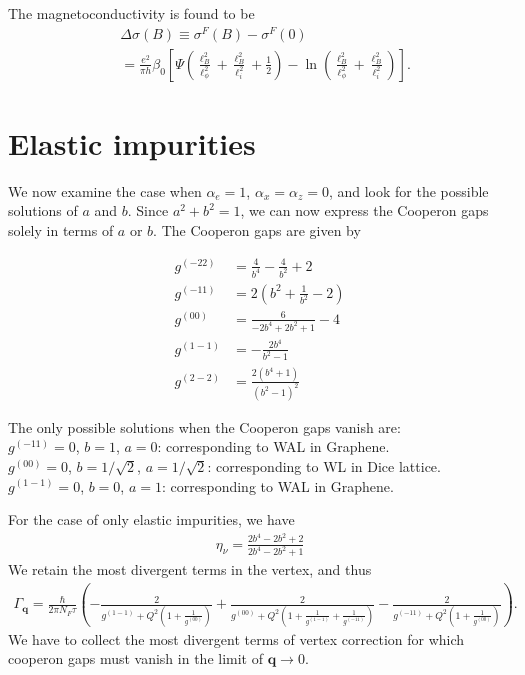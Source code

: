 \documentclass[aps,prb,amsmath,amssymb,footinbib,showpacs,twocolumn]{revtex4-2}
\begin{document}
\begin{widetext}
The magnetoconductivity is found to be
\begin{align}
    &\Delta\sigma(B) \equiv  \sigma^{F}(B)- \sigma^{F}(0) \nonumber\\ 
    &=\frac{e^{2}}{\pi h}\beta_{0}\left[\Psi\left(\frac{\ell^{2}_{B}}{\ell^{2}_{\phi}}+\frac{\ell^{2}_{B}}{\ell^{2}_{i}}+\frac{1}{2}\right)-\ln\left(\frac{\ell^{2}_{B}}{\ell^{2}_{\phi}}+\frac{\ell^{2}_{B}}{\ell^{2}_{i}}\right)\right].
\end{align}
\section{Elastic impurities} 

We now examine the case when $\alpha_e=1$, $\alpha_x=\alpha_z=0$, and look for the possible solutions of $a$ and $b$. Since $a^2+b^2=1$, we can now express the Cooperon gaps solely in terms of $a$ or $b$. The Cooperon gaps are given by 

\begin{align}
    g^{(-22)}&=\frac{4}{b^4}-\frac{4}{b^2}+2\nonumber\\
    g^{(-11)}&=2 \left(b^2+\frac{1}{b^2}-2\right)\nonumber\\
    g^{(00)}&=\frac{6}{-2 b^4+2 b^2+1}-4\nonumber\\
    g^{(1-1)}&=-\frac{2 b^4}{b^2-1}\nonumber\\
    g^{(2-2)}&=\frac{2\left(b^4+1\right)}{\left(b^2-1\right)^2}
\end{align}

The only possible solutions when the Cooperon gaps vanish are: \\

$g^{(-11)}=0$, $b=1$, $a=0$: corresponding to WAL in Graphene.\\

$g^{(00)}=0$, $b=1/\sqrt{2}$, $a=1/\sqrt{2}$: corresponding to WL in Dice lattice.\\

$g^{(1-1)}=0$, $b=0$, $a=1$: corresponding to WAL in Graphene.

For the case of only elastic impurities, we have 
\begin{align}
    \eta_\nu = \frac{2b^4 - 2b^2 +2}{2b^4-2b^2+1}
\end{align}
We retain the most divergent terms in the vertex, and thus 
\begin{align}
    \Gamma_{\mathbf{q}}=\frac{\hbar}{2\pi N_{F}\tau}\left(-\frac{2}{g^{(1-1)}+Q^2\left(1+\frac{1}{g^{(00)}}\right) }+ \frac{2}{g^{(00)}+Q^2\left(1+\frac{1}{g^{(1-1)}}+\frac{1}{g^{(-11)}}\right)} - \frac{2}{g^{(-11)}+Q^2\left(1+\frac{1}{g^{(00)}}\right)} \right).
\end{align}
We have to collect the most divergent terms of vertex correction for which cooperon gaps must vanish in the limit of $\mathbf{q}\to 0$. 

\end{widetext}
\end{document}
